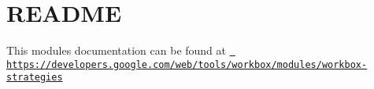 \chapter{README}
\hypertarget{md_pkiclassroomrescheduler_2src_2main_2frontend_2node__modules_2workbox-strategies_2_r_e_a_d_m_e}{}\label{md_pkiclassroomrescheduler_2src_2main_2frontend_2node__modules_2workbox-strategies_2_r_e_a_d_m_e}
This module\textquotesingle{}s documentation can be found at \href{https://developers.google.com/web/tools/workbox/modules/workbox-strategies}{\texttt{ https\+://developers.\+google.\+com/web/tools/workbox/modules/workbox-\/strategies}} 